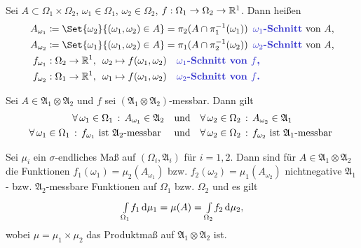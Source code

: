 \documentclass{cheat-sheet}
\newcommand{\Alg}{\mathfrak{A}} %
\begin{document}


\begin{defn}
  Sei $A \subset \Omega_1 \times \Omega_2$, $\omega_1 \in \Omega_1$, $\omega_2 \in \Omega_2$, $f : \Omega_1 \to \Omega_2 \to \mathbb{R}^1$. Dann heißen
  \begin{align*}
    A_{\omega_1} &\coloneqq \Set{ \omega_2 }{ (\omega_1, \omega_2) \in A } = \pi_2(A \cap \pi_1^{-1}(\omega_1)) \enspace \text{\emph{$\omega_1$-Schnitt} von $A$,} \\
    A_{\omega_2} &\coloneqq \Set{ \omega_1 }{ (\omega_1, \omega_2) \in A } = \pi_1(A \cap \pi_2^{-1}(\omega_2)) \enspace \text{\emph{$\omega_2$-Schnitt} von $A$,} \\
    f_{\omega_1} &: \Omega_2 \to \R^1, \enspace \omega_2 \mapsto f(\omega_1, \omega_2) \quad \text{\emph{$\omega_1$-Schnitt von $f$,}} \\
    f_{\omega_2} &: \Omega_1 \to \R^1, \enspace \omega_1 \mapsto f(\omega_1, \omega_2) \quad \text{\emph{$\omega_2$-Schnitt von $f$.}}
  \end{align*}
\end{defn}

\begin{satz}
  Sei $A \in \Alg_1 \otimes \Alg_2$ und $f$ sei $(\Alg_1 {\otimes} \Alg_2)$-messbar. Dann gilt
  \begin{align*}
    \fa{\omega_1 \in \Omega_1} A_{\omega_1} \in \Alg_2
    \quad &\text{und} \quad
    \fa{\omega_2 \in \Omega_2} A_{\omega_2} \in \Alg_1 \\
    \fa{\omega_1 \in \Omega_1} f_{\omega_1} \text{ ist $\Alg_2$-messbar }
    \quad &\text{und} \quad
    \fa{\omega_2 \in \Omega_2} f_{\omega_2} \text{ ist $\Alg_1$-messbar }
  \end{align*}
\end{satz}

\begin{lem}
  Sei $\mu_i$ ein $\sigma$-endliches Maß auf $(\Omega_i, \Alg_i)$ für $i = 1,2$. Dann sind für $A \in \Alg_1 \otimes \Alg_2$ die Funktionen $f_1(\omega_1) = \mu_2(A_{\omega_1})$ bzw. $f_2(\omega_2) = \mu_1(A_{\omega_2})$ nichtnegative $\Alg_1$- bzw. $\Alg_2$-messbare Funktionen auf $\Omega_1$ bzw. $\Omega_2$ und es gilt
  \[
    {\textstyle \int\limits_{\Omega_1}^{}} f_1 \,\mathrm{d} \mu_1 = \mu(A) = {\textstyle \int\limits_{\Omega_2}^{}} f_2 \,\mathrm{d} \mu_2,
  \]
  wobei $\mu = \mu_1 \times \mu_2$ das Produktmaß auf $\Alg_1 \otimes \Alg_2$ ist.
\end{lem}
\end{document}

